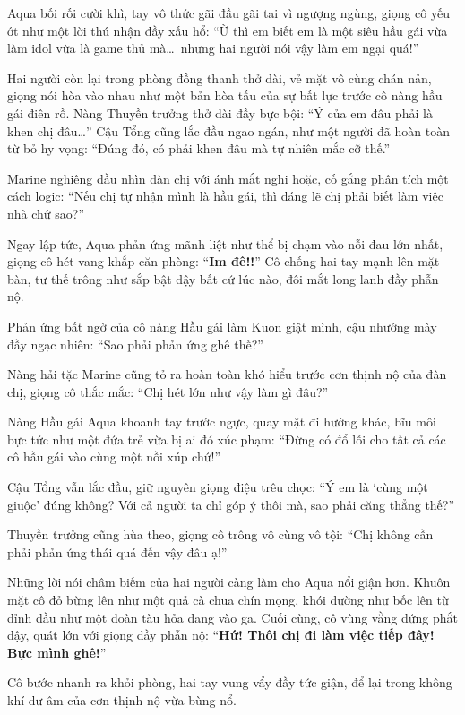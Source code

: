 \documentclass[../main.tex]{subfiles}
\begin{document}
Aqua bối rối cười khì, tay vô thức gãi đầu gãi tai vì ngượng ngùng, giọng cô yếu ớt như một lời thú nhận đầy xấu hổ: ``Ừ thì em biết em là một siêu hầu gái vừa làm idol vừa là game thủ mà\dots\ nhưng hai người nói vậy làm em ngại quá!''

Hai người còn lại trong phòng đồng thanh thở dài, vẻ mặt vô cùng chán nản, giọng nói hòa vào nhau như một bản hòa tấu của sự bất lực trước cô nàng hầu gái điên rồ. Nàng Thuyền trưởng thở dài đầy bực bội: ``Ý của em đâu phải là khen chị đâu\dots'' Cậu Tổng cũng lắc đầu ngao ngán, như một người đã hoàn toàn từ bỏ hy vọng: ``Đúng đó, có phải khen đâu mà tự nhiên mắc cỡ thế.''

Marine nghiêng đầu nhìn đàn chị với ánh mắt nghi hoặc, cố gắng phân tích một cách logic: ``Nếu chị tự nhận mình là hầu gái, thì đáng lẽ chị phải biết làm việc nhà chứ sao?''

Ngay lập tức, Aqua phản ứng mãnh liệt như thể bị chạm vào nỗi đau lớn nhất, giọng cô hét vang khắp căn phòng: ``\textbf{Im đê!!}'' Cô chống hai tay mạnh lên mặt bàn, tư thế trông như sắp bật dậy bất cứ lúc nào, đôi mắt long lanh đầy phẫn nộ.


Phản ứng bất ngờ của cô nàng Hầu gái làm Kuon giật mình, cậu nhướng mày đầy ngạc nhiên: ``Sao phải phản ứng ghê thế?''

Nàng hải tặc Marine cũng tỏ ra hoàn toàn khó hiểu trước cơn thịnh nộ của đàn chị, giọng cô thắc mắc: ``Chị hét lớn như vậy làm gì đâu?''

Nàng Hầu gái Aqua khoanh tay trước ngực, quay mặt đi hướng khác, bĩu môi bực tức như một đứa trẻ vừa bị ai đó xúc phạm: ``Đừng có đổ lỗi cho tất cả các cô hầu gái vào cùng một nồi xúp chứ!''

Cậu Tổng vẫn lắc đầu, giữ nguyên giọng điệu trêu chọc: ``Ý em là `cùng một giuộc' đúng không? Với cả người ta chỉ góp ý thôi mà, sao phải căng thẳng thế?''

Thuyền trưởng cũng hùa theo, giọng cô trông vô cùng vô tội: ``Chị không cần phải phản ứng thái quá đến vậy đâu ạ!''

Những lời nói châm biếm của hai người càng làm cho Aqua nổi giận hơn. Khuôn mặt cô đỏ bừng lên như một quả cà chua chín mọng, khói dường như bốc lên từ đỉnh đầu như một đoàn tàu hỏa đang vào ga. Cuối cùng, cô vùng vằng đứng phắt dậy, quát lớn với giọng đầy phẫn nộ: ``\textbf{Hứ! Thôi chị đi làm việc tiếp đây! Bực mình ghê!}''


Cô bước nhanh ra khỏi phòng, hai tay vung vẩy đầy tức giận, để lại trong không khí dư âm của cơn thịnh nộ vừa bùng nổ.
\end{document}
